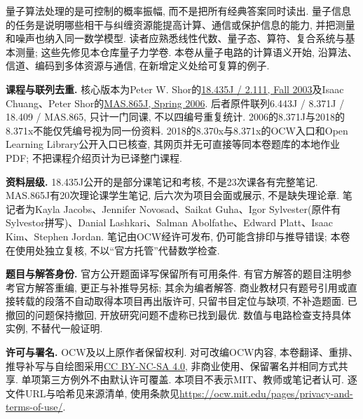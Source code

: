 量子算法处理的是可控制的概率振幅, 而不是把所有经典答案同时读出. 量子信息的任务是说明哪些相干与纠缠资源能提高计算、通信或保护信息的能力, 并把测量和噪声也纳入同一数学模型. 读者应熟悉线性代数、量子态、算符、复合系统与基本测量; 这些先修见本仓库量子力学卷. 本卷从量子电路的计算语义开始, 沿算法、信道、编码到多体资源与通信, 在新增定义处给可复算的例子.

\textbf{课程与联列去重.} 核心版本为Peter W. Shor的\href{https://ocw.mit.edu/courses/18-435j-quantum-computation-fall-2003/}{18.435J / 2.111, Fall 2003}及Isaac Chuang、Peter Shor的\href{https://ocw.mit.edu/courses/mas-865j-quantum-information-science-spring-2006/}{MAS.865J, Spring 2006}. 后者原件联列6.443J / 8.371J / 18.409 / MAS.865, 只计一门同课, 不以四编号重复统计. 2006的8.371J与2018的8.371x不能仅凭编号视为同一份资料. 2018的8.370x与8.371x的OCW入口和Open Learning Library公开入口已核查, 其网页并无可直接等同本卷题库的本地作业PDF; 不把课程介绍页计为已译整门课程.

\textbf{资料层级.} 18.435J公开的是部分课笔记和考核, 不是23次课各有完整笔记. MAS.865J有20次理论课学生笔记, 后六次为项目会面或展示, 不是缺失理论章. 笔记者为Kayla Jacobs、Jennifer Novosad、Saikat Guha、Igor Sylvester(原件有Sylvestor拼写)、Danial Lashkari、Salman Abolfathe、Edward Platt、Isaac Kim、Stephen Jordan. 笔记由OCW经许可发布, 仍可能含排印与推导错误; 本卷在使用处独立复核, 不以“官方托管”代替数学检查.

\textbf{题目与解答身份.} 官方公开题面译写保留所有可用条件. 有官方解答的题目注明参考官方解答重编, 更正与补推导另标; 其余为编者解答. 商业教材只有题号引用或直接转载的段落不自动取得本项目再出版许可, 只留书目定位与缺项, 不补造题面. 已撤回的问题保持撤回, 开放研究问题不虚称已找到最优. 数值与电路检查支持具体实例, 不替代一般证明.

\textbf{许可与署名.} OCW及以上原作者保留权利. 对可改编OCW内容, 本卷翻译、重排、推导补写与自绘图采用\href{https://creativecommons.org/licenses/by-nc-sa/4.0/}{CC BY-NC-SA 4.0}, 非商业使用、保留署名并相同方式共享. 单项第三方例外不由默认许可覆盖. 本项目不表示MIT、教师或笔记者认可. 逐文件URL与哈希见来源清单, 使用条款见\url{https://ocw.mit.edu/pages/privacy-and-terms-of-use/}.
